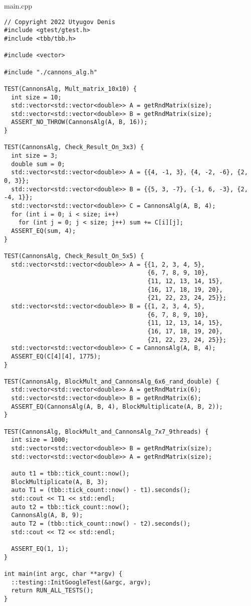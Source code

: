\documentclass{report}
\begin{document}
main.cpp
\begin{lstlisting}
// Copyright 2022 Utyugov Denis
#include <gtest/gtest.h>
#include <tbb/tbb.h>

#include <vector>

#include "./cannons_alg.h"

TEST(CannonsAlg, Mult_matrix_10x10) {
  int size = 10;
  std::vector<std::vector<double>> A = getRndMatrix(size);
  std::vector<std::vector<double>> B = getRndMatrix(size);
  ASSERT_NO_THROW(CannonsAlg(A, B, 16));
}

TEST(CannonsAlg, Check_Result_On_3x3) {
  int size = 3;
  double sum = 0;
  std::vector<std::vector<double>> A = {{4, -1, 3}, {4, -2, -6}, {2, 0, 3}};
  std::vector<std::vector<double>> B = {{5, 3, -7}, {-1, 6, -3}, {2, -4, 1}};
  std::vector<std::vector<double>> C = CannonsAlg(A, B, 4);
  for (int i = 0; i < size; i++)
    for (int j = 0; j < size; j++) sum += C[i][j];
  ASSERT_EQ(sum, 4);
}

TEST(CannonsAlg, Check_Result_On_5x5) {
  std::vector<std::vector<double>> A = {{1, 2, 3, 4, 5},
                                        {6, 7, 8, 9, 10},
                                        {11, 12, 13, 14, 15},
                                        {16, 17, 18, 19, 20},
                                        {21, 22, 23, 24, 25}};
  std::vector<std::vector<double>> B = {{1, 2, 3, 4, 5},
                                        {6, 7, 8, 9, 10},
                                        {11, 12, 13, 14, 15},
                                        {16, 17, 18, 19, 20},
                                        {21, 22, 23, 24, 25}};
  std::vector<std::vector<double>> C = CannonsAlg(A, B, 4);
  ASSERT_EQ(C[4][4], 1775);
}

TEST(CannonsAlg, BlockMult_and_CannonsAlg_6x6_rand_double) {
  std::vector<std::vector<double>> A = getRndMatrix(6);
  std::vector<std::vector<double>> B = getRndMatrix(6);
  ASSERT_EQ(CannonsAlg(A, B, 4), BlockMultiplicate(A, B, 2));
}

TEST(CannonsAlg, BlockMult_and_CannonsAlg_7x7_9threads) {
  int size = 1000;
  std::vector<std::vector<double>> B = getRndMatrix(size);
  std::vector<std::vector<double>> A = getRndMatrix(size);
  
  auto t1 = tbb::tick_count::now();
  BlockMultiplicate(A, B, 3);
  auto T1 = (tbb::tick_count::now() - t1).seconds();
  std::cout << T1 << std::endl;
  auto t2 = tbb::tick_count::now();
  CannonsAlg(A, B, 9);
  auto T2 = (tbb::tick_count::now() - t2).seconds();
  std::cout << T2 << std::endl;
  
  ASSERT_EQ(1, 1);
}

int main(int argc, char **argv) {
  ::testing::InitGoogleTest(&argc, argv);
  return RUN_ALL_TESTS();
}
\end{lstlisting}
\end{document}
